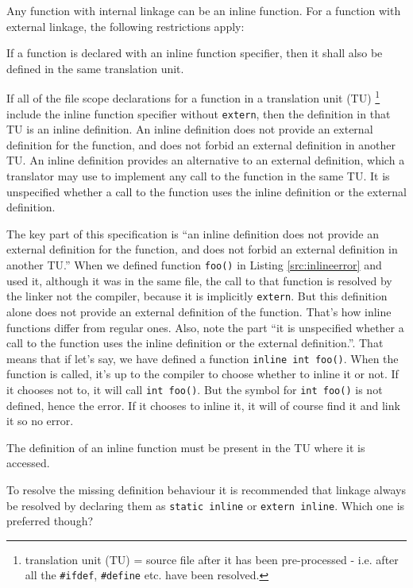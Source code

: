\begin{myquote}
Any function with internal linkage can be an inline function. For a function with external linkage, the following restrictions apply: 

If a function is declared with an inline function specifier, then it shall also be defined in the same translation unit.

If all of the file scope declarations for a function in a translation unit (TU) \footnote{translation unit (TU) = source file after it has been pre-processed - i.e. after all the \texttt{\#ifdef}, \texttt{\#define} etc. have been resolved.} include the inline function specifier without \texttt{extern}, then the definition in that TU is an inline definition. An inline definition does not provide an external definition for the function, and does not forbid an external definition in another TU. An inline definition provides an alternative to an external definition, which a translator may use to implement any call to the function in the same TU. It is unspecified whether a call to the function uses the inline definition or the external definition.\end{myquote}

The key part of this specification is ``an inline definition does not provide an external definition for the function, and does not forbid an external definition in another TU.'' When we defined function \texttt{foo()} in Listing \ref{src:inlineerror} and used it, although it was in the same file, the call to that function is resolved by the linker not the compiler, because it is implicitly \texttt{extern}. But this definition alone does not provide an external definition of the function. That's how inline functions differ from regular ones. 
Also, note the part ``it is unspecified whether a call to the function uses the inline definition or the external definition.''. That means that if let's say, we have defined a function \texttt{inline int foo()}. When the function is called, it's up to the compiler to choose whether to inline it or not. If it chooses not to, it will call \texttt{int foo()}. But the symbol for \texttt{int foo()} is not defined, hence the error. If it chooses to inline it, it will of course find it and link it so no error.
\begin{takeaway}
The definition of an inline function must be present in the TU where it is accessed.
\end{takeaway}
To resolve the missing definition behaviour it is recommended that linkage  always be resolved by declaring them as \texttt{static inline} or \texttt{extern inline}. Which one is preferred though?



